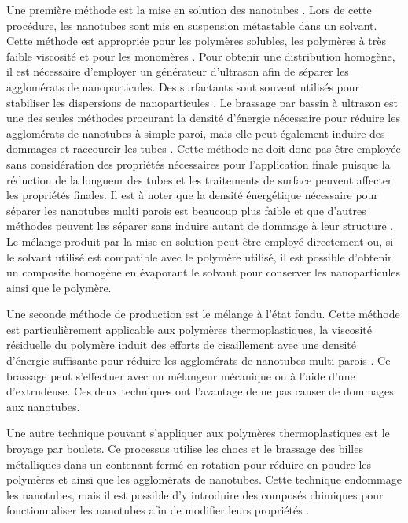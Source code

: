 Une première méthode est la mise en solution des nanotubes \cite{Mohammad2006}.
Lors de cette procédure, les nanotubes sont mis en suspension métastable dans un solvant. 
Cette méthode est appropriée pour les polymères solubles, les polymères à très faible viscosité et pour les monomères \cite{Ma2010}. 
Pour obtenir une distribution homogène, il est nécessaire d'employer un générateur d'ultrason afin de séparer les agglomérats de nanoparticules. 
Des surfactants sont souvent utilisés pour stabiliser les dispersions de nanoparticules \cite{Huang2012}. 
Le brassage par bassin à ultrason est une des seules méthodes procurant la densité d'énergie nécessaire pour réduire les agglomérats de nanotubes à simple paroi, mais elle peut également induire des dommages et raccourcir les tubes \cite{Huang2012}. 
Cette méthode ne doit donc pas être employée sans considération des propriétés nécessaires pour l'application finale puisque la réduction de la longueur des tubes \cite{Grossiord2008a} et les traitements de surface \cite{Diez-Pascual2010, Ma2008} peuvent affecter les propriétés finales.  
Il est à noter que la densité énergétique nécessaire pour séparer les nanotubes multi parois est beaucoup plus faible et que d'autres méthodes peuvent les séparer sans induire autant de dommage à leur structure \cite{Huang2012}. 
Le mélange produit par la mise en solution peut être employé directement ou, si le solvant utilisé est compatible avec le polymère utilisé, il est possible d'obtenir un composite homogène en évaporant le solvant pour conserver les nanoparticules ainsi que le polymère. 

Une seconde méthode de production est le mélange à l'état fondu. 
Cette méthode est particulièrement applicable aux polymères thermoplastiques, la viscosité résiduelle du polymère induit des efforts de cisaillement avec une densité d'énergie suffisante pour réduire les agglomérats de nanotubes multi parois \cite{Huang2012}. 
Ce brassage peut s'effectuer avec un mélangeur mécanique ou à l'aide d'une d'extrudeuse. 
Ces deux techniques ont l'avantage de ne pas causer de dommages aux nanotubes. 

Une autre technique pouvant s'appliquer aux polymères thermoplastiques est le broyage par boulets. 
Ce processus utilise les chocs et le brassage des billes métalliques dans un contenant fermé en rotation pour réduire en poudre les polymères et ainsi que les agglomérats de nanotubes.
Cette technique endommage les nanotubes, mais il est possible d'y introduire des composés chimiques pour fonctionnaliser les nanotubes afin de modifier leurs propriétés \cite{Ma2010}. 

